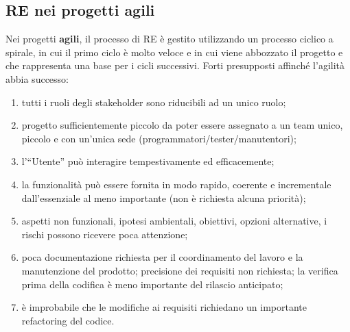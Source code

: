 \subsection{RE nei progetti agili}
Nei progetti \textbf{agili}, il processo di RE è gestito utilizzando un processo ciclico a spirale, in cui il primo ciclo è molto veloce e in cui viene abbozzato il progetto e che rappresenta una base per i cicli successivi. Forti presupposti affinché l'agilità abbia successo:
\begin{enumerate}
	\item  tutti i ruoli degli stakeholder sono riducibili ad un unico ruolo;
	\item progetto sufficientemente piccolo da poter essere assegnato a un team unico, piccolo e con un'unica sede (programmatori/tester/manutentori);
	\item l'“Utente” può interagire tempestivamente ed efficacemente;
	\item la funzionalità può essere fornita in modo rapido, coerente e incrementale dall'essenziale al
	meno importante (non è richiesta alcuna priorità);
	\item  aspetti non funzionali, ipotesi ambientali, obiettivi, opzioni alternative, i rischi possono ricevere poca attenzione;
	\item poca documentazione richiesta per il coordinamento del lavoro e la manutenzione del prodotto;
	precisione dei requisiti non richiesta; la verifica prima della codifica è meno importante del rilascio anticipato;
	\item è improbabile che le modifiche ai requisiti richiedano un importante refactoring del codice.
\end{enumerate}
